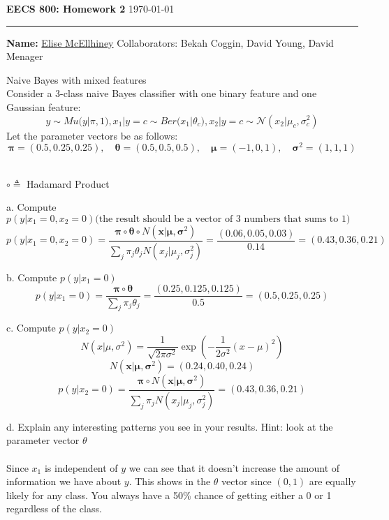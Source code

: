 \documentclass[draft]{exam} %
\theoremstyle{definition} \newtheorem*{defn}{Definition}
\begin{document}
\noindent\textbf{\large{EECS 800: Homework 2}} \hfill \today
\hrule \bigskip
\noindent \textbf{Name:} \underline{Elise McEllhiney} \qquad Collaborators: Bekah Coggin, David Young, David Menager

\begin{questions} \printanswers

 Naive Bayes with mixed features \\
Consider a 3-class naive Bayes classifier with one binary feature and one Gaussian feature:
$$y \sim Mu( y | \pi , 1 ), x_1 | y = c \sim Ber( x_1 | \theta_c ), x_2 | y = c \sim \mathcal{N} ( x_2 | \mu_c , \sigma_c^2 )$$
Let the parameter vectors be as follows:
$$\pmb{\pi} = (0.5, 0.25, 0.25), \quad \pmb{\theta} = (0.5, 0.5, 0.5), \quad \pmb{\mu} = (-1, 0, 1), \quad \pmb{\sigma}^2 = (1, 1, 1)$$

\begin{solution} \\ %
$\circ \triangleq$ Hadamard Product

a. Compute $p( y | x_1 = 0, x_2 =  0 ) \text{(the result should be a vector of 3 numbers that sums to 1)}$\\
$$p(y|x_1=0, x_2=0) = \frac{\pmb{\pi}\circ\pmb{\theta}\circ N(\pmb{x} | \pmb{\mu}, \pmb{\sigma}^2 )}{\sum_j \pi_j \theta_j N(x_j | \mu_j, \sigma_j^2 )} = \frac{(0.06, 0.05, 0.03)}{0.14} = (0.43, 0.36, 0.21)$$

b. Compute $p( y | x_1 = 0 )$\\
$$p(y | x_1 = 0) = \frac{\pmb{\pi}\circ \pmb{\theta}}{\sum_j \pi_j \theta_j} = \frac{(0.25, 0.125, 0.125)}{0.5} = (0.5, 0.25, 0.25)$$

c. Compute $p( y | x_2 = 0 )$\\
$$N(x|\mu, \sigma^2) = \frac{1}{\sqrt{2 \pi \sigma^2 }}\exp{(-\frac{1}{2 \sigma^2}(x-\mu)^2)}$$
$$N(\pmb{x} | \pmb{\mu}, \pmb{\sigma}^2 ) = (0.24, 0.40, 0.24)$$
$$p(y | x_2 = 0) =  \frac{\pmb{\pi}\circ N(\pmb{x} | \pmb{\mu}, \pmb{\sigma}^2 )}{\sum_j \pi_j N(x_j | \mu_j, \sigma_j^2 )} = (0.43, 0.36, 0.21)$$

d. Explain any interesting patterns you see in your results.  Hint: look at the parameter vector $\theta$ \\\\
Since $x_1$ is independent of $y$ we can see that it doesn't increase the amount of information we have about $y$.  This shows in the $\theta$ vector since $(0,1)$ are equally likely for any class.  You always have a 50\% chance of getting either a 0 or 1 regardless of the class.
\end{solution}



\end{questions}
\end{document}
